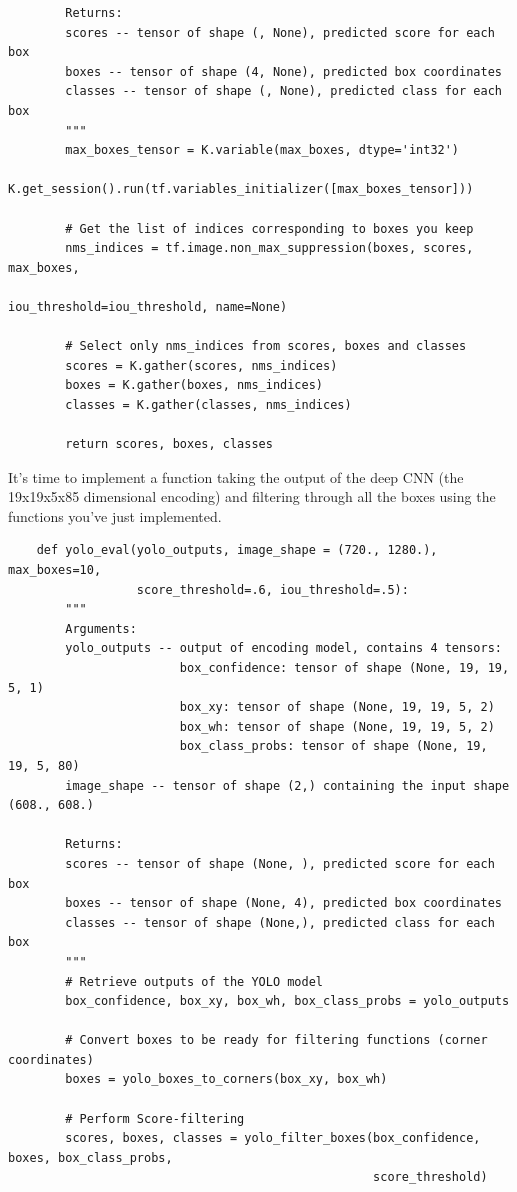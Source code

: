 \documentclass[11pt, a4paper]{article}
\begin{document}
\begin{spacing}{1.1}
\begin{lstlisting}
		Returns:
		scores -- tensor of shape (, None), predicted score for each box
		boxes -- tensor of shape (4, None), predicted box coordinates
		classes -- tensor of shape (, None), predicted class for each box
		"""
		max_boxes_tensor = K.variable(max_boxes, dtype='int32') 
		K.get_session().run(tf.variables_initializer([max_boxes_tensor]))
		
		# Get the list of indices corresponding to boxes you keep
		nms_indices = tf.image.non_max_suppression(boxes, scores, max_boxes, 
		                                           iou_threshold=iou_threshold, name=None)
		
		# Select only nms_indices from scores, boxes and classes
		scores = K.gather(scores, nms_indices)
		boxes = K.gather(boxes, nms_indices)
		classes = K.gather(classes, nms_indices)
		
		return scores, boxes, classes \end{lstlisting} \vspace*{1mm}
	It's time to implement a function taking the output of the deep CNN (the 19x19x5x85 dimensional encoding) and filtering through all the boxes using the functions you've just implemented. 
	\begin{lstlisting}
	def yolo_eval(yolo_outputs, image_shape = (720., 1280.), max_boxes=10, 
	              score_threshold=.6, iou_threshold=.5):
		"""		
		Arguments:
		yolo_outputs -- output of encoding model, contains 4 tensors:
		                box_confidence: tensor of shape (None, 19, 19, 5, 1)
		                box_xy: tensor of shape (None, 19, 19, 5, 2)
		                box_wh: tensor of shape (None, 19, 19, 5, 2)
	                    box_class_probs: tensor of shape (None, 19, 19, 5, 80)
		image_shape -- tensor of shape (2,) containing the input shape (608., 608.)
		
		Returns:
		scores -- tensor of shape (None, ), predicted score for each box
		boxes -- tensor of shape (None, 4), predicted box coordinates
		classes -- tensor of shape (None,), predicted class for each box
		"""
		# Retrieve outputs of the YOLO model
		box_confidence, box_xy, box_wh, box_class_probs = yolo_outputs
		
		# Convert boxes to be ready for filtering functions (corner coordinates)
		boxes = yolo_boxes_to_corners(box_xy, box_wh)
		
		# Perform Score-filtering
		scores, boxes, classes = yolo_filter_boxes(box_confidence, boxes, box_class_probs, 
		                                           score_threshold)
		

\end{lstlisting}
\end{spacing}
\end{document}
